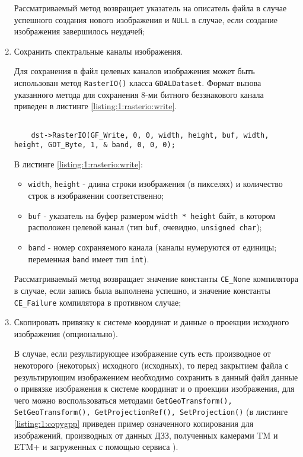 \begin{enumerate}
\begin{itemize}
	\end{itemize}

	Рассматриваемый метод возвращает указатель на описатель файла в случае успешного создания нового изображения и \verb|NULL| в случае, если создание изображения завершилось неудачей;

	\item Сохранить спектральные каналы изображения.

	Для сохранения в файл целевых каналов изображения может быть использован метод \verb|RasterIO()| класса \verb|GDALDataset|. Формат вызова указанного метода для сохранения 8-ми битного беззнакового канала приведен в листинге \ref{listing:1:rasterio:write}.

	\begin{lstlisting}

	dst->RasterIO(GF_Write, 0, 0, width, height, buf, width, height, GDT_Byte, 1, & band, 0, 0, 0);

	\end{lstlisting}
	\mylistingend

	В листинге \ref{listing:1:rasterio:write}:

	\begin{itemize}

		\item \verb|width|, \verb|height| - длина строки изображения (в пикселях) и количество строк в изображении соответственно;
		\item \verb|buf| - указатель на буфер размером \verb|width * height| байт, в котором расположен целевой канал (тип \verb|buf|, очевидно, \verb|unsigned char|);
		\item \verb|band| - номер сохраняемого канала (каналы нумеруются от единицы; переменная \verb|band| имеет тип \verb|int|).

	\end{itemize}
			
	Рассматриваемый метод возвращает значение константы \verb|CE_None| компилятора в случае, если запись была выполнена успешно, и значение константы \verb|CE_Failure| компилятора в противном случае;

	\item Скопировать привязку к системе координат и данные о проекции исходного изображения (опционально).

	В случае, если результирующее изображение суть есть производное от некоторого (некоторых) исходного (исходных), то перед закрытием файла с результирующим изображением необходимо сохранить в данный файл данные о привязке изображения к системе координат и о проекции изображения, для чего можно воспользоваться методами \linebreak \verb|GetGeoTransform(), SetGeoTransform(), GetProjectionRef(), SetProjection()| (в листинге \ref{listing:1:copygpp} приведен пример означенного копирования для изображений, производных от данных ДЗЗ, полученных камерами TM и ETM+ и загруженных с помощью сервиса \ee).


\end{enumerate}
